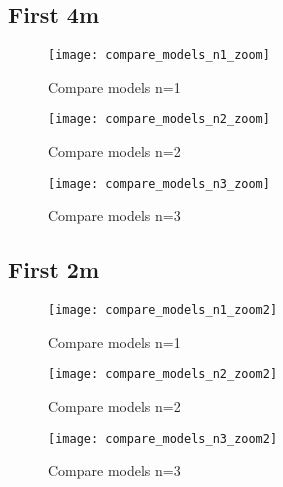 \subsection{First 4m}
\begin{figure}[H]
  \centering
  \texttt{[image: compare\_models\_n1\_zoom]}
  \caption{Compare models n=1}
  \label{fig:compare_models_n1}
\end{figure}
\begin{figure}[H]
  \centering
  \texttt{[image: compare\_models\_n2\_zoom]}
  \caption{Compare models n=2}
  \label{fig:compare_models_n2}
\end{figure}
\begin{figure}[H]
  \centering
  \texttt{[image: compare\_models\_n3\_zoom]}
  \caption{Compare models n=3}
  \label{fig:compare_models_n3}
\end{figure}

\subsection{First 2m}
\begin{figure}[H]
  \centering
  \texttt{[image: compare\_models\_n1\_zoom2]}
  \caption{Compare models n=1}
  \label{fig:compare_models_n1}
\end{figure}
\begin{figure}[H]
  \centering
  \texttt{[image: compare\_models\_n2\_zoom2]}
  \caption{Compare models n=2}
  \label{fig:compare_models_n2}
\end{figure}
\begin{figure}[H]
  \centering
  \texttt{[image: compare\_models\_n3\_zoom2]}
  \caption{Compare models n=3}
  \label{fig:compare_models_n3}
\end{figure}
